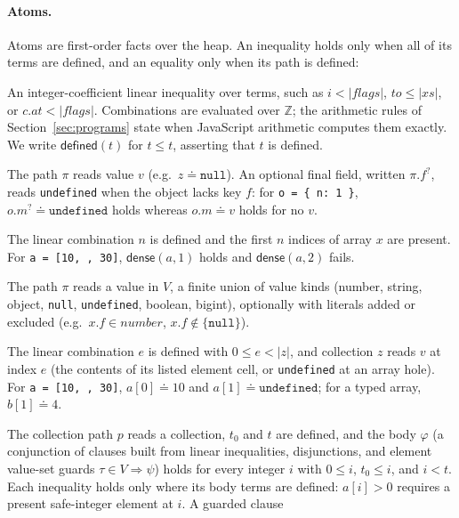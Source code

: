\documentclass[10pt,a4paper]{article}
\theoremstyle{definition}
\theoremstyle{remark}
\newcommand{\kw}[1]{\mathsf{#1}}
\newcommand{\dense}{\kw{dense}}
\newcommand{\len}[1]{|#1|}
\newcommand{\code}[1]{\texttt{#1}}
\begin{document}
\paragraph{Atoms.} Atoms are first-order facts over the heap. An
inequality holds only when all of its terms are defined, and an equality
only when its path is defined:
\begin{description}[leftmargin=1.5em,style=nextline]
\item[Linear inequality] An integer-coefficient linear inequality over
terms, such as $i<\len{\mathit{flags}}$, $\mathit{to}\le\len{\mathit{xs}}$,
or $c.\mathit{at}<\len{\mathit{flags}}$. Combinations are evaluated over
$\mathbb{Z}$; the arithmetic rules of Section~\ref{sec:programs} state
when JavaScript arithmetic computes them exactly. We write
$\kw{defined}(t)$ for $t\le t$, asserting that $t$ is defined.
\item[Equality $\pi\doteq v$] The path $\pi$ reads value $v$ (e.g.\
$z\doteq\code{null}$). An optional final field, written $\pi.f^{?}$,
reads \code{undefined} when the object lacks key $f$: for
\code{o = \{ n: 1 \}}, $o.m^{?}\doteq\code{undefined}$ holds whereas
$o.m\doteq v$ holds for no $v$.
\item[Density $\dense(x,n)$] The linear combination $n$ is defined and
the first $n$ indices of array $x$ are present. For
\code{a = [10, , 30]}, $\dense(a,1)$ holds and $\dense(a,2)$ fails.
\item[Contents $\pi\in V$] The path $\pi$ reads a value in $V$, a finite
union of value kinds (number, string, object, \code{null},
\code{undefined}, boolean, bigint), optionally with literals added or
excluded (e.g.\ $x.f\in\mathit{number}$, $x.f\notin\{\code{null}\}$).
\item[{Element $z[e]\doteq v$}] The linear combination $e$ is defined with
$0\le e<\len z$, and collection $z$ reads $v$ at index $e$ (the contents
of its listed element cell, or \code{undefined} at an array hole). For
\code{a = [10, , 30]}, $a[0]\doteq 10$ and $a[1]\doteq\code{undefined}$;
for a typed array, $b[1]\doteq 4$.
\item[Bounded quantification $\forall_{p}\, t_0\le i<t.\ \varphi$] The
collection path $p$ reads a collection, $t_0$ and $t$ are defined, and the
body $\varphi$ (a conjunction of clauses built from linear inequalities,
disjunctions, and element value-set guards $\tau\in V\Rightarrow\psi$)
holds for every integer $i$ with $0\le i$, $t_0\le i$, and $i<t$. Each
inequality holds only where its body terms are defined: $a[i]>0$ requires
a present safe-integer element at $i$. A guarded clause

\end{description}
\end{document}
